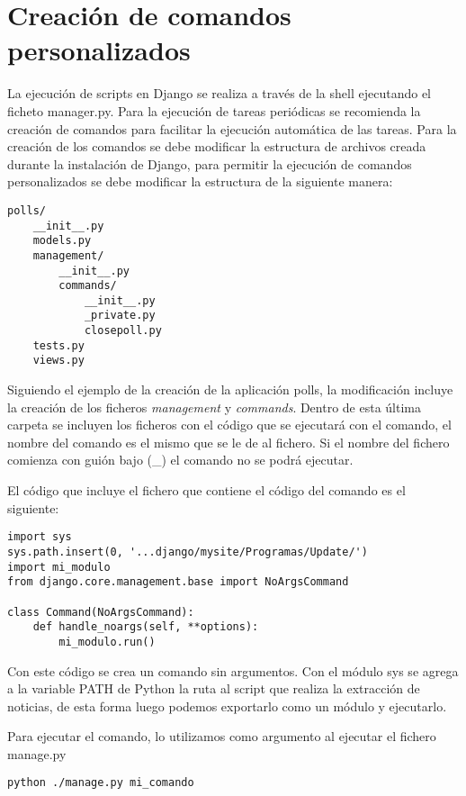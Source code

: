 \section{Creación de comandos personalizados}

La ejecución de scripts en Django se realiza a través de la shell ejecutando el ficheto manager.py. Para la ejecución de tareas periódicas se recomienda la creación de comandos para facilitar la ejecución automática de las tareas. Para la creación de los comandos se debe modificar la estructura de archivos creada durante la instalación de Django, para permitir la ejecución de comandos personalizados se debe modificar la estructura de la siguiente manera:

\begin{lstlisting}
polls/
    __init__.py
    models.py
    management/
        __init__.py
        commands/
            __init__.py
            _private.py
            closepoll.py
    tests.py
    views.py
\end{lstlisting}

Siguiendo el ejemplo de la creación de la aplicación polls, la modificación incluye la creación de los ficheros \textit{management} y \textit{commands}. Dentro de esta última carpeta se incluyen los ficheros con el código que se ejecutará con el comando, el nombre del comando es el mismo que se le de al fichero. Si el nombre del fichero comienza con guión bajo (\_) el comando no se podrá ejecutar.

El código que incluye el fichero que contiene el código del comando es el siguiente:

\begin{lstlisting}
import sys
sys.path.insert(0, '...django/mysite/Programas/Update/')
import mi_modulo
from django.core.management.base import NoArgsCommand

class Command(NoArgsCommand):
    def handle_noargs(self, **options):
		mi_modulo.run()

\end{lstlisting}

Con este código se crea un comando sin argumentos. Con el módulo sys se agrega a la variable PATH de Python la ruta al script que realiza la extracción de noticias, de esta forma luego podemos exportarlo como un módulo y ejecutarlo.

Para ejecutar el comando, lo utilizamos como argumento al ejecutar el fichero manage.py


\begin{lstlisting}
python ./manage.py mi_comando
\end{lstlisting}
